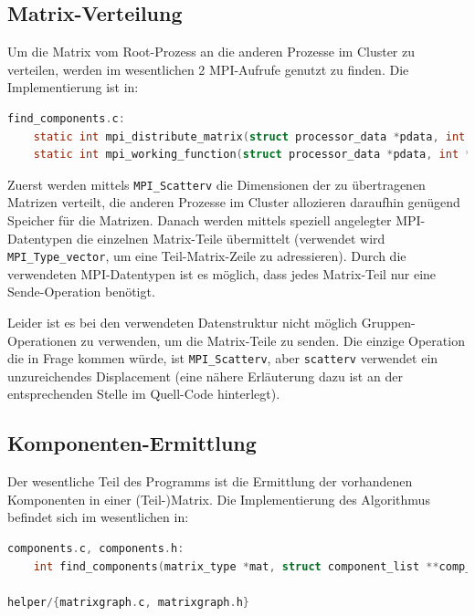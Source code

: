 \subsection{Matrix-Verteilung}

Um die Matrix vom Root-Prozess an die anderen Prozesse im Cluster zu verteilen, werden im wesentlichen 2 MPI-Aufrufe genutzt zu finden. Die Implementierung ist in:

\begin{lstlisting}[language=C, aboveskip=\baselineskip, basicstyle=\footnotesize\ttfamily, lineskip=0pt]
find_components.c:
	static int mpi_distribute_matrix(struct processor_data *pdata, int *dims, matrix_type *input_matrix)
	static int mpi_working_function(struct processor_data *pdata, int *dims)
\end{lstlisting}

Zuerst werden mittels \verb+MPI_Scatterv+ die Dimensionen der zu übertragenen Matrizen verteilt, die anderen Prozesse im Cluster allozieren daraufhin genügend Speicher für die Matrizen. Danach werden mittels speziell angelegter MPI-Datentypen die einzelnen Matrix-Teile übermittelt (verwendet wird \verb+MPI_Type_vector+, um eine Teil-Matrix-Zeile zu adressieren). Durch die verwendeten MPI-Datentypen ist es möglich, dass jedes Matrix-Teil nur eine Sende-Operation benötigt.

Leider ist es bei den verwendeten Datenstruktur nicht möglich Gruppen-Operationen zu verwenden, um die Matrix-Teile zu senden. Die einzige Operation die in Frage kommen würde, ist \verb+MPI_Scatterv+, aber \verb+scatterv+ verwendet ein unzureichendes Displacement (eine nähere Erläuterung dazu ist an der entsprechenden Stelle im Quell-Code hinterlegt).

\subsection{Komponenten-Ermittlung} \label{algorithm:find_components}

Der wesentliche Teil des Programms ist die Ermittlung der vorhandenen Komponenten in einer (Teil-)Matrix. Die Implementierung des Algorithmus befindet sich im wesentlichen in:

\begin{lstlisting}[language=C, aboveskip=\baselineskip, basicstyle=\footnotesize\ttfamily, lineskip=0pt]
components.c, components.h:
	int find_components(matrix_type *mat, struct component_list **comp_list, vector_type **borders)

helper/{matrixgraph.c, matrixgraph.h}
\end{lstlisting}

